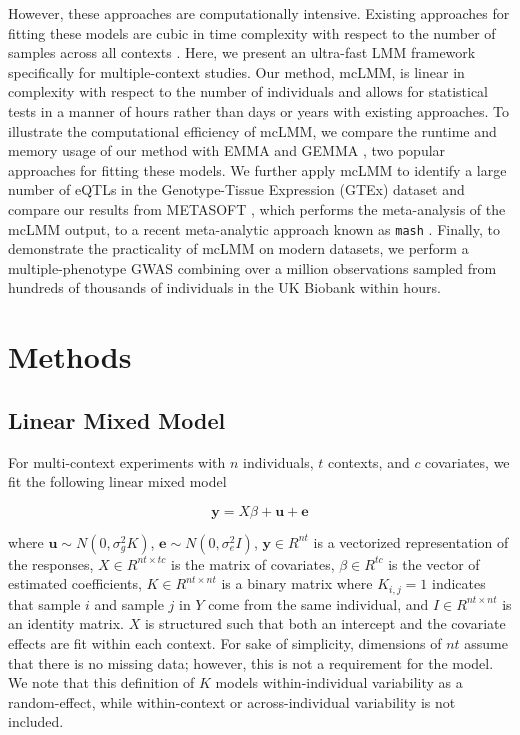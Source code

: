     However, these approaches are computationally intensive. Existing approaches for fitting these models are cubic in time complexity with respect to the number of samples across all contexts \cite{Kang, Zhou}. Here, we present an ultra-fast LMM framework specifically for multiple-context studies. Our method, mcLMM, is linear in complexity with respect to the number of individuals and allows for statistical tests in a manner of hours rather than days or years with existing approaches. To illustrate the computational efficiency of mcLMM, we compare the runtime and memory usage of our method with EMMA and GEMMA \cite{Kang, Zhou}, two popular approaches for fitting these models. We further apply mcLMM to identify a large number of eQTLs in the Genotype-Tissue Expression (GTEx) dataset \cite{GTEx_Consortium2020-xx} and compare our results from METASOFT \cite{Metasoft}, which performs the meta-analysis of the mcLMM output, to a recent meta-analytic approach known as \texttt{mash} \cite{Urbut2019}. Finally, to demonstrate the practicality of mcLMM on modern datasets, we perform a multiple-phenotype GWAS combining over a million observations sampled from hundreds of thousands of individuals in the UK Biobank \cite{Bycroft2018} within hours.

\section{Methods}

   \subsection{Linear Mixed Model}
        For multi-context experiments with $n$ individuals, $t$ contexts, and $c$ covariates, we fit the following linear mixed model
        
        \begin{equation}
            \mathbf{y} = X\beta + \mathbf{u} + \mathbf{e}
        \end{equation}
        
        \noindent where $\mathbf{u} \sim N(0,\sigma_g^2 K)$, $\mathbf{e} \sim N(0,\sigma_e^2 I)$,  $\mathbf{y} \in R^{nt}$ is a vectorized representation of the responses, $X \in R^{nt \times tc}$ is the matrix of covariates,
        $\beta \in R^{tc}$ is the vector of estimated coefficients, $K \in R^{nt \times nt}$ is a binary matrix where $K_{i,j} = 1$ 
        indicates that sample $i$ and sample $j$ in $Y$ come from the same individual, and $I \in R^{nt \times nt}$ is an identity matrix.
        $X$ is structured such that both an intercept and the covariate effects are fit within each context. For sake of simplicity, dimensions
        of $nt$ assume that there is no missing data; however, this is not a requirement for the model. We note that this definition of $K$ models within-individual variability as a random-effect, while within-context or across-individual variability is not included.
        

